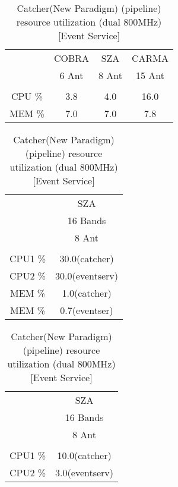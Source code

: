 \documentclass[11pt]{article}
\begin{document}
\begin{table}
\caption{DO resource utilization}
\label{tab:corrDOCPUresource}
\begin{center}
\begin{tabular}{|c|c|c|c|}
\hline
& COBRA & SZA   & CARMA \\
& 6 Ant & 8 Ant & 15 Ant \\
&&& \\
\hline\hline
CPU \% & 3.8 & 4.0 & 16.0 \\
\hline
MEM \% & 7.0 & 7.0 & 7.8  \\
\hline
\end{tabular}
\end{center}
\vskip 5mm

\caption{Catcher (pipeline) resource utilization (dual 800MHz)[Event Service]}
\label{tab:pipeDOCPUresource}
\begin{center}
\begin{tabular}{|c|c|}
\hline
& SZA  \\
& 16 Bands\\
& 8 Ant\\
& \\
\hline\hline
CPU1 \% & 30.0(catcher)  \\
CPU2 \% & 30.0(eventserv)  \\
\hline
MEM \% & 1.0(catcher)  \\
MEM \% & 0.7(eventser) \\
\hline
\end{tabular}
\end{center}
\vskip 5mm

\caption{Catcher(New Paradigm) (pipeline) resource utilization (dual 800MHz)[Event Service]}
\label{tab:pipeDOCPUresource2}
\begin{center}
\begin{tabular}{|c|c|}
\hline
& SZA    \\
& 16 Bands \\
& 8 Ant  \\
& \\
\hline\hline
CPU1 \% & 10.0(catcher)   \\
CPU2 \% &  3.0(eventserv) \\
\hline
\end{tabular}
\end{center}
\end{table}
\end{document}
